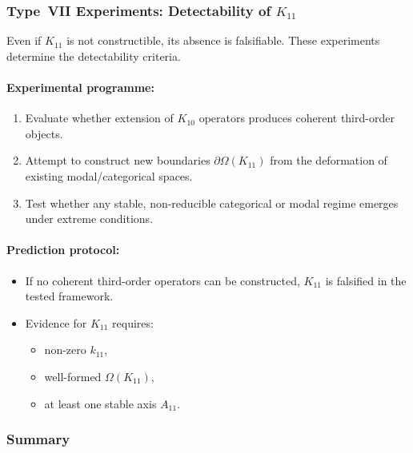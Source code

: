 \subsubsection{Type~VII Experiments: Detectability of $K_{11}$}

Even if $K_{11}$ is not constructible, its absence is falsifiable.
These experiments determine the detectability criteria.

\paragraph{Experimental programme:}

\begin{enumerate}
    \item Evaluate whether extension of $K_{10}$ operators produces
          coherent third-order objects.
    \item Attempt to construct new boundaries $\partial\Omega(K_{11})$
          from the deformation of existing modal/categorical spaces.
    \item Test whether any stable, non-reducible categorical or modal
          regime emerges under extreme conditions.
\end{enumerate}

\paragraph{Prediction protocol:}

\begin{itemize}
    \item If no coherent third-order operators can be constructed,
          $K_{11}$ is falsified in the tested framework.
    \item Evidence for $K_{11}$ requires:
          \begin{itemize}
              \item non-zero $k_{11}$,
              \item well-formed $\Omega(K_{11})$,
              \item at least one stable axis $A_{11}$.
          \end{itemize}
\end{itemize}



\subsubsection{Summary}

